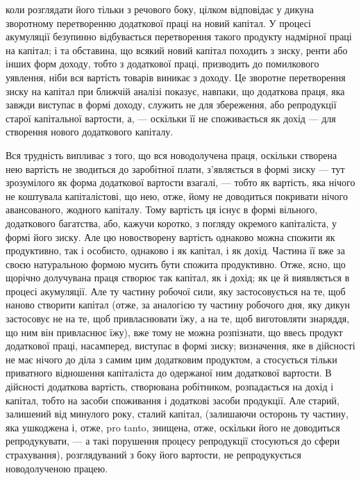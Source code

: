 \parcont{}  %
коли розглядати його тільки з речового боку, цілком відповідає у дикуна зворотному
перетворенню додаткової праці на новий капітал. У процесі акумуляції
безупинно відбувається перетворення такого продукту надмірної праці на капітал;
і та обставина, що всякий новий капітал походить з зиску, ренти або інших
форм доходу, тобто з додаткової праці, призводить до помилкового уявлення,
ніби вся вартість товарів виникає з доходу. Це зворотне перетворення зиску
на капітал при ближчій аналізі показує, навпаки, що додаткова праця, яка завжди
виступає в формі доходу, служить не для збереження, або репродукції старої
капітальної вартости, а, — оскільки її не споживається як дохід — для створення
нового додаткового капіталу.

Вся трудність випливає з того, що вся новодолучена праця, оскільки
створена нею вартість не зводиться до заробітної плати, з’являється в формі
зиску — тут зрозумілого як форма додаткової вартости взагалі, — тобто як
вартість, яка нічого не коштувала капіталістові, що нею, отже, йому не доводиться
покривати нічого авансованого, жодного капіталу. Тому вартість ця існує
в формі вільного, додаткового багатства, або, кажучи коротко, з погляду окремого
капіталіста, у формі його зиску. Але цю новостворену вартість однаково
можна спожити    як продуктивно, так і особисто, однаково і як капітал, і як
дохід. Частина її вже за своєю натуральною формою мусить бути спожита    продуктивно. Отже, ясно, що
щорічно долучувана праця створює так капітал, як і
дохід; як це й виявляється в процесі акумуляції. Але ту частину робочої сили,
яку застосовується на те, щоб наново створити капітал (отже, за аналогією
ту частину робочого дня, яку дикун застосовує не на те, щоб привласнювати
їжу, а на те, щоб виготовляти знаряддя, що ним він привласнює їжу), вже тому
не можна розпізнати, що ввесь продукт додаткової праці, насамперед, виступає
в формі зиску; визначення, яке в дійсності не має нічого до діла з самим
цим додатковим продуктом, а стосується тільки приватного відношення капіталіста
до одержаної ним додаткової вартости. В дійсності додаткова вартість,
створювана робітником, розпадається на дохід і капітал, тобто на засоби споживання
і додаткові засоби продукції. Але старий, залишений від минулого
року, сталий капітал, (залишаючи осторонь ту частину, яка ушкоджена і, отже,
pro tanto, знищена, отже, оскільки його не доводиться репродукувати, — а такі
порушення процесу репродукції стосуються до сфери страхування), розглядуваний
з боку його вартости, не репродукується новодолученою працею.

